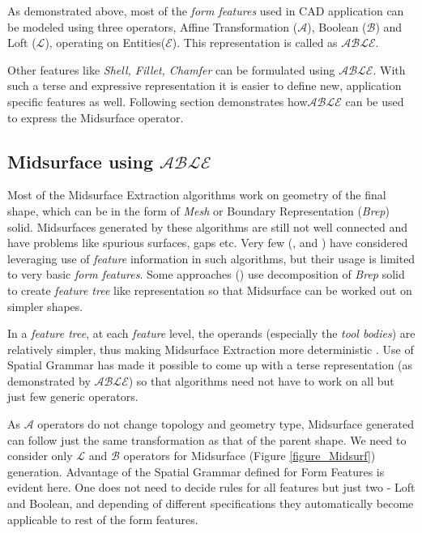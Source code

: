 As demonstrated above, most of the {\em form features} used in CAD application can be modeled using  three operators, Affine Transformation ($\mathcal{A}$),  Boolean ($\mathcal{B}$) and Loft ($\mathcal{L}$), operating on Entities($\mathcal{E}$). This representation is called as {\bf $\mathcal{ABLE}$}. 

Other features like {\em Shell, Fillet, Chamfer} can be formulated using {\bf $\mathcal{ABLE}$}. With such a terse and expressive representation it is easier to define new, application specific features as well.  Following section demonstrates how{\bf $\mathcal{ABLE}$} can be used to express the Midsurface operator.



\subsection{Midsurface using $\mathcal{ABLE}$}

Most of the Midsurface Extraction algorithms work on geometry of the final shape, which can be in the form of {\em Mesh} or Boundary Representation ({\em Brep}) solid. Midsurfaces generated by these algorithms are still  not well connected and have problems like spurious surfaces, gaps etc. Very few (\cite{Hamdi2005}, \cite{Robinson2006} and \cite{Stolt2005}) have considered leveraging use of {\em feature} information in such algorithms, but their usage is limited to very basic {\em form features}. Some approaches (\cite{Boussuge2013a}) use decomposition of {\em Brep} solid to create {\em feature tree} like representation so that Midsurface can be worked out on simpler shapes.

In a {\em feature tree}, at each {\em feature} level, the operands (especially the {\em tool bodies}) are relatively simpler, thus making Midsurface Extraction more deterministic \cite{YogeshIITM2013}.  Use of Spatial Grammar has made it possible to come up with a terse representation (as demonstrated by $\mathcal{ABLE}$) so that algorithms need not have to work on all but just few generic operators. 

As  {\bf $\mathcal{A}$} operators do not change topology and geometry type, Midsurface generated can follow just the same transformation as that of the parent shape. We need to consider only  {\bf $\mathcal{L}$}  and  {\bf $\mathcal{B}$} operators for Midsurface (Figure \ref{figure_Midsurf}) generation. Advantage of the Spatial Grammar defined for Form Features is evident here. One does not need to decide rules for all features but just two - Loft and Boolean, and depending of different specifications they automatically become applicable to rest of the form features.

